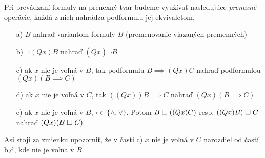 Pri prevádzaní formuly na prenexný tvar budeme využívať nasledujúce
\emph{prenexné} operácie, každá z nich nahrádza podformulu
jej ekvivaletom.
\begin{itemize}
    \item[a)] $B$ nahraď variantom formuly $B$ (premenovanie viazaných
    premenných)
    \item[b)] $\neg(Q x) B$ nahraď $(\overline{Q} x) \neg B$
    \item[c)] ak $x$ nie je voľná v $B$, tak podformulu $B\implies (Qx)C$
            nahraď podformulou $(Qx) (B\implies C)$
    \item[d)] ak $x$ nie je voľná v $C$, tak $((Qx)) B \implies C$
        nahraď $(Qx) (B \implies C)$
    \item[e)] ak $x$ nie je voľná v $B$, $\square \in \{\land,\lor\}$.
     Potom $B \;\square\; ((Qx)C)$ resp. $((Qx)B)\;\square\; C$ nahraď
     $(Qx)(B \;\square\; C)$
\end{itemize}
\begin{poznamka}
    Asi stojí za zmienku upozorniť, že v časti c) $x$ nie je voľná v
    $C$ narozdiel od častí b,d, kde nie je voľna v $B$.
\end{poznamka}

